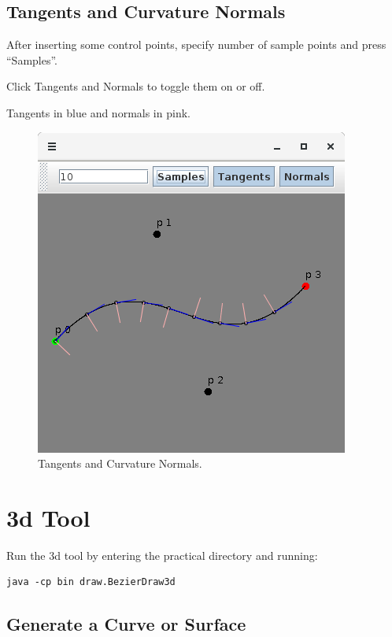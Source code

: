 \documentclass{article}
\begin{document}
\subsection{Tangents and Curvature Normals}

After inserting some control points, specify number of sample points and press ``Samples''.

Click Tangents and Normals to toggle them on or off.

Tangents in blue and normals in pink.

\begin{figure}[!htb]
  \caption{Tangents and Curvature Normals. }
  \centering
  \includegraphics[scale=0.38]{images/image2.png}
\end{figure}

\section{3d Tool}

Run the 3d tool by entering the practical directory and running:

\begin{verbatim}
java -cp bin draw.BezierDraw3d
\end{verbatim}

\subsection{Generate a Curve or Surface}
\end{document}
